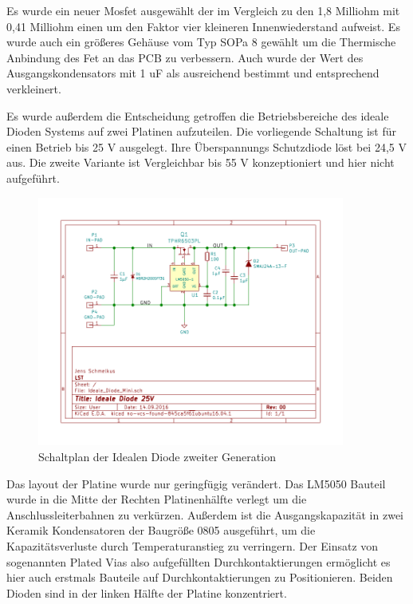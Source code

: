 Es wurde ein neuer Mosfet ausgewählt der im Vergleich zu den 1,8 Milliohm mit 0,41 Milliohm einen um den Faktor vier kleineren Innenwiederstand aufweist. Es wurde auch ein größeres Gehäuse vom Typ SOPa 8 gewählt um die Thermische Anbindung des Fet an das PCB zu verbessern.
Auch wurde der Wert des Ausgangskondensators mit 1 uF als ausreichend bestimmt und entsprechend verkleinert.

Es wurde außerdem die Entscheidung getroffen die Betriebsbereiche des ideale Dioden Systems auf zwei Platinen aufzuteilen. Die vorliegende Schaltung ist für einen Betrieb bis 25 V ausgelegt. Ihre Überspannungs Schutzdiode löst bei 24,5 V aus.
Die zweite Variante ist Vergleichbar bis 55 V konzeptioniert und hier nicht aufgeführt.


\begin{figure}[H]
\centering
\includegraphics[width=0.9\textwidth]{Schaltplaene/Ideale_Diode_25V_rev00-ver00.pdf} 
\caption{Schaltplan der Idealen Diode zweiter Generation} 
\label{fig:Schaltplan der Idealen Diode zweiter Generation}
\end{figure}

Das layout der Platine wurde nur geringfügig verändert. Das LM5050 Bauteil wurde in die Mitte der Rechten Platinenhälfte verlegt um die Anschlussleiterbahnen zu verkürzen. Außerdem ist die Ausgangskapazität in zwei Keramik Kondensatoren der Baugröße 0805 ausgeführt, um die Kapazitätsverluste durch Temperaturanstieg zu verringern.
Der Einsatz von sogenannten Plated Vias also aufgefüllten Durchkontaktierungen ermöglicht es hier auch erstmals Bauteile auf Durchkontaktierungen zu Positionieren.
Beiden Dioden sind in der linken Hälfte der Platine konzentriert.

